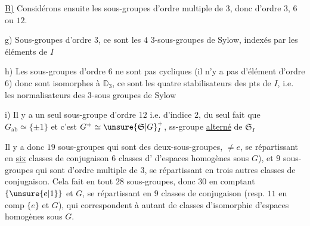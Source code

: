 
\uline{B)} Considérons ensuite les sous-groupes  d'ordre multiple de $3$, donc d'ordre $3$, $6$ ou $12$.

g) Sous-groupes d'ordre $3$, ce sont les $4$ $3$-sous-groupes de Sylow, indexés par les éléments de $I$

h) Les sous-groupes d'ordre $6$ ne sont pas cycliques (il n'y a pas d'élément d'ordre $6$) donc sont isomorphes à $\mathbb D_3$,  ce sont les quatre stabilisateurs des pts de $I$, i.e. les normalisateurs des $3$-sous groupes de Sylow

i) Il y a un seul sous-groupe d'ordre $12$ i.e. d'indice $2$, du seul fait que  $G_{\mathrm{ab}}\simeq\{\pm1\}$ et c'est $G^+\simeq\unsure{\mathfrak S|G}_I^+$, ss-groupe \uline{alterné} de $\mathfrak S_I$

Il y a donc  $19$ sous-groupes qui sont des deux-sous-groupes, $\ne e$, se répartissant en \uline{six} classes de conjugaison   $6$ classes d' d'espaces homogènes sous $G$), et $9$ sous-groupes  qui sont d'ordre multiple de $3$, se répartissant en trois autres classes de conjugaison. Cela fait en tout $28$ sous-groupes, donc $30$ en comptant $\{\unsure{e|1}\}$ et $G$, se répartissant en $9$ classes de conjugaison (resp. $11$ en comp $\{e\}$ et $G$), qui correspondent à autant de classes d'isomorphie d'espaces homogènes sous $G$.



